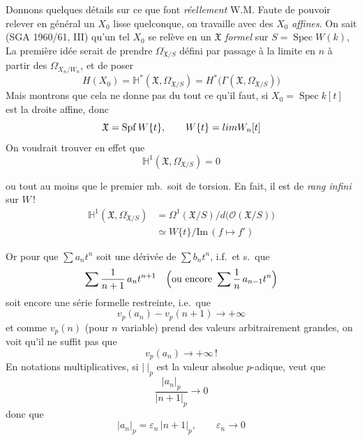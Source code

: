 \documentclass[11pt,a4paper]{article}
\begin{document}
Donnons quelques détails sur ce que font \emph{réellement} W.M. Faute de
pouvoir relever en général un $X_0$ lisse quelconque, on travaille
 avec des $X_0$ \emph{affines}. On sait (SGA 1960/61, III)
qu'un tel $X_0$ se relève en un $\mathfrak{X}$ \emph{formel} 
sur $S = \operatorname{Spec} W(k)$,  La première idée serait de prendre
$\Omega^{\cdot}_{\mathfrak{X}/S}$ défini par passage à la limite en $n$ à
partir des $\Omega^{\cdot}_{X_n/W_n}$, et de poser
\[
  H(X_0) = \mathbb{H}^{*}(\mathfrak{X}, \Omega^{\cdot}_{\mathfrak{X}/S})
  = H^{*}\bigl(\Gamma(\mathfrak{X}, \Omega^{\cdot}_{\mathfrak{X}/S})\bigr)
\]
Mais montrons que cela ne donne pas du tout ce qu'il faut, \struck{\ill{}}
si $X_0 = \operatorname{Spec} k[t]$ est la droite affine, donc
\[
  \mathfrak{X} = \operatorname{Spf} W\{t\} ,
  \qquad W\{t\} = \varprojlim W_n[t]
\]
On voudrait trouver en effet que
\[
  \mathbb{H}^{1}(\mathfrak{X}, \Omega^{\cdot}_{\mathfrak{X}/S}) = 0
\]


ou tout au moins que le premier mb.\ soit de torsion. En fait, il est de
\emph{rang infini} sur $W$\,!
\[
  \begin{aligned}
  \mathbb{H}^{1}(\mathfrak{X}, \Omega^{\cdot}_{\mathfrak{X}/S})
  &= \Omega^{1}(\mathfrak{X}/S) / d\bigl(\mathcal{O}(\mathfrak{X}/S)\bigr) \\
  &\simeq W\{t\} / \mathrm{Im}\,(f \mapsto f')
  \end{aligned}
\]

Or pour que $\sum a_n t^{n}$ soit une dérivée de $\sum b_n t^{n}$, i.f.\ et
s.\ que
\[
  \sum \frac{1}{n+1}\, a_n t^{n+1}
  \quad \Bigl(\text{ou encore } \sum \frac{1}{n}\, a_{n-1} t^{n}\Bigr)
\]
soit encore une série formelle restreinte, i.e.\ que
\[
  v_p(a_n) - v_p(n+1) \longrightarrow +\infty
\]
et comme $v_p(n)$ (pour $n$ variable) prend des valeurs arbitrairement
grandes, on voit qu'il ne suffit pas que
\[
  v_p(a_n) \longrightarrow +\infty\,!
\]
En notations multiplicatives, si $|\ |_p$ est la valeur absolue
$p$-adique,  veut que
\[
  \frac{|a_n|_p}{|n+1|_p} \longrightarrow 0
\]
donc que
\[
  |a_n|_p = \varepsilon_n\, |n+1|_p , \qquad \varepsilon_n \longrightarrow 0
\]
\end{document}
